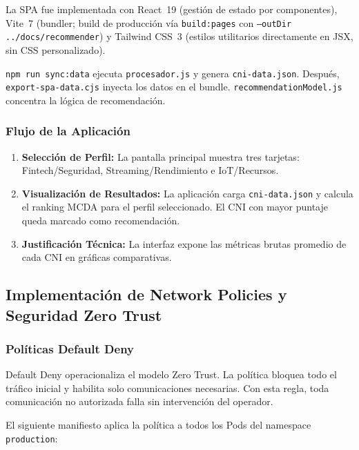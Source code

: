 La SPA fue implementada con React~19 (gestión de estado por componentes), Vite~7 (bundler; build de producción vía \texttt{build:pages} con \texttt{--outDir ../docs/recommender}) y Tailwind CSS~3 (estilos utilitarios directamente en JSX, sin CSS personalizado).

\texttt{npm run sync:data} ejecuta \texttt{procesador.js} y genera \texttt{cni-data.json}. Después, \texttt{export-spa-data.cjs} inyecta los datos en el bundle. \texttt{recommendationModel.js} concentra la lógica de recomendación.

\subsubsection{Flujo de la Aplicación}

\begin{enumerate}
\item \textbf{Selección de Perfil:} La pantalla principal muestra tres tarjetas: Fintech/Seguridad, Streaming/Rendimiento e IoT/Recursos.
\item \textbf{Visualización de Resultados:} La aplicación carga \texttt{cni-data.json} y calcula el ranking MCDA para el perfil seleccionado. El CNI con mayor puntaje queda marcado como recomendación.
\item \textbf{Justificación Técnica:} La interfaz expone las métricas brutas promedio de cada CNI en gráficas comparativas.
\end{enumerate}

\subsection{Implementación de Network Policies y Seguridad Zero Trust}

\subsubsection{Políticas Default Deny}

Default Deny operacionaliza el modelo Zero Trust. La política bloquea todo el tráfico inicial y habilita solo comunicaciones necesarias. Con esta regla, toda comunicación no autorizada falla sin intervención del operador.

El siguiente manifiesto aplica la política a todos los Pods del namespace \texttt{production}:

